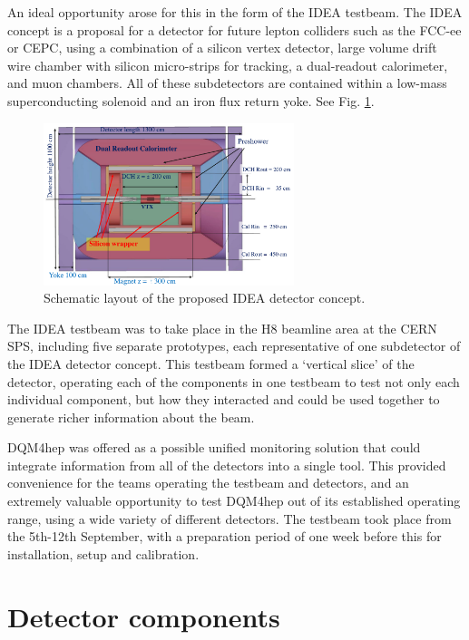 An ideal opportunity arose for this in the form of the \acrshort{IDEA} testbeam. The \acrfull{IDEA} concept is a proposal for a detector for future lepton colliders such as the \acrshort{FCC}-ee or \acrshort{CEPC}, using a combination of a silicon vertex detector, large volume drift wire chamber with silicon micro-strips for tracking, a dual-readout calorimeter, and muon chambers. All of these subdetectors are contained within a low-mass superconducting solenoid and an iron flux return yoke. See Fig. \ref{figure:idea/detector-concept}.

\begin{figure}[h]
	\centering
	\includegraphics[width=0.65\textwidth]{../Pictures/IDEA/IDEA-concept.png}
	\caption{Schematic layout of the proposed \acrshort{IDEA} detector concept.}
	\label{figure:idea/detector-concept}
\end{figure}

The \acrshort{IDEA} testbeam was to take place in the H8 beamline area at the \acrshort{CERN} \acrshort{SPS}, including five separate prototypes, each representative of one subdetector of the \acrshort{IDEA} detector concept. This testbeam formed a `vertical slice' of the detector, operating each of the components in one testbeam to test not only each individual component, but how they interacted and could be used together to generate richer information about the beam.

\acrshort{DQM4hep} was offered as a possible unified monitoring solution that could integrate information from all of the detectors into a single tool. This provided convenience for the teams operating the testbeam and detectors, and an extremely valuable opportunity to test \acrshort{DQM4hep} out of its established operating range, using a wide variety of different detectors. The testbeam took place from the 5th-12th September, with a preparation period of one week before this for installation, setup and calibration.

\section{Detector components}

